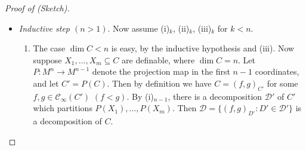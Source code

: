 \documentclass[a4paper]{report}
\makeatletter
\newcommand{\C}{\mathcal{C}}
\newcommand{\D}{\mathcal{D}}
\newcommand{\M}{\mathcal{M}}
\theoremstyle{definition}
\theoremstyle{remstyle}
\providecommand*{\dashv}{%
	\mathrel{%
		\mathpalette\@dashv\vdash
	}%
}
\newcommand*{\@dashv}[2]{%
	\reflectbox{$\m@th#1#2$}%
}
\newenvironment{subproof}[1][\proofname]{%
	\renewcommand{\qedsymbol}{$\dashv$}%
	\begin{proof}[#1]%
	}{%
	\end{proof}%
}
\makeatother
\begin{document}
\begin{proof}[Proof of  (Sketch)]
\begin{itemize}[leftmargin=*,itemsep=12pt]
\begin{enumerate}[itemsep=12pt,label=(\roman*)$_1$]
\begin{subproof}[Proof of (iv)$_\mathit{1}$ (Sketch)]
\begin{center}
				            \end{center}

				            In particular, for all $c'\in I$ we must have $|\phi(c';\M)|\geq L$. Since $c$ is a boundary point for $X$, the function $x\mapsto|\phi(x;\M)|$ is not constant on any neighbourhood of $c$. So without loss of generality, there is an open interval $I_0=(c,c_0)\subseteq I$ such that $|\phi(c';\M)|>L$ for all $c'\in I_0$. Then the function
				            \begin{equation*}
					            g(x)=\min\{y:\phi(x;y),\,(x,y)\notin\Gamma(g_i)\cup\cdots\cup\Gamma(g_L)\}
				            \end{equation*}
				            is definable on $I_0$. Using  and the fact that $\phi_-$, $\phi_+$ are continuous on $(a,b)$, we get that $d:=\lim_{x\to c^+}g(x)$ exists in $M$. But now considering the two cases $\phi(c;d)$ and $\neg\phi(c;d)$, we get a contradiction to $c$ being good for $\phi$.
			            \end{subproof}
		      \end{enumerate}

		\item \emph{Inductive step $(n>1)$}. Now assume (i)$_k$, (ii)$_k$, (iii)$_k$ for $k<n$.
		      \begin{enumerate}[itemsep=12pt,label=(\roman*)$_n$]
			      \item The case $\dim C<n$ is easy, by the inductive hypothesis and  (iii). Now suppose $X_1,\ldots,X_m\subseteq C$ are definable, where $\dim C=n$. Let $P:M^n\to M^{n-1}$ denote the projection map in the first $n-1$ coordinates, and let $C'=P(C)$. Then by definition we have $C=(f,g)_{C'}$ for some $f,g\in \C_{\infty}(C')$ $(f<g)$. By (i)$_{n-1}$, there is a decomposition $\D'$ of $C'$ which partitions $P(X_1),\ldots,P(X_m)$. Then $\D=\{(f,g)_{D'}:D'\in\D'\}$ is a decomposition of $C$.


\end{enumerate}
\end{itemize}
\end{proof}
\end{document}
